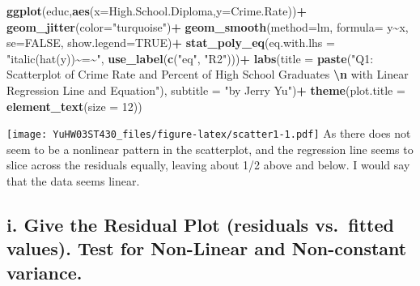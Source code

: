 \documentclass[
]{article}
\newenvironment{Shaded}{\begin{snugshade}}{\end{snugshade}}
\newcommand{\AttributeTok}[1]{\textcolor[rgb]{0.13,0.29,0.53}{#1}}
\newcommand{\ConstantTok}[1]{\textcolor[rgb]{0.56,0.35,0.01}{#1}}
\newcommand{\DecValTok}[1]{\textcolor[rgb]{0.00,0.00,0.81}{#1}}
\newcommand{\FunctionTok}[1]{\textcolor[rgb]{0.13,0.29,0.53}{\textbf{#1}}}
\newcommand{\NormalTok}[1]{#1}
\newcommand{\SpecialCharTok}[1]{\textcolor[rgb]{0.81,0.36,0.00}{\textbf{#1}}}
\newcommand{\StringTok}[1]{\textcolor[rgb]{0.31,0.60,0.02}{#1}}
\begin{document}
\begin{Shaded}
\begin{Highlighting}[]
\FunctionTok{ggplot}\NormalTok{(educ,}\FunctionTok{aes}\NormalTok{(}\AttributeTok{x=}\NormalTok{High.School.Diploma,}\AttributeTok{y=}\NormalTok{Crime.Rate))}\SpecialCharTok{+}
  \FunctionTok{geom\_jitter}\NormalTok{(}\AttributeTok{color=}\StringTok{"turquoise"}\NormalTok{)}\SpecialCharTok{+}
  \FunctionTok{geom\_smooth}\NormalTok{(}\AttributeTok{method=}\StringTok{\textquotesingle{}lm\textquotesingle{}}\NormalTok{, }\AttributeTok{formula=}\NormalTok{ y}\SpecialCharTok{\textasciitilde{}}\NormalTok{x, }
              \AttributeTok{se=}\ConstantTok{FALSE}\NormalTok{,}
              \AttributeTok{show.legend=}\ConstantTok{TRUE}\NormalTok{)}\SpecialCharTok{+}
    \FunctionTok{stat\_poly\_eq}\NormalTok{(}\AttributeTok{eq.with.lhs =} \StringTok{"italic(hat(y))\textasciitilde{}\textasciigrave{}=\textasciigrave{}\textasciitilde{}"}\NormalTok{,}
               \FunctionTok{use\_label}\NormalTok{(}\FunctionTok{c}\NormalTok{(}\StringTok{"eq"}\NormalTok{, }\StringTok{"R2"}\NormalTok{)))}\SpecialCharTok{+}
  \FunctionTok{labs}\NormalTok{(}\AttributeTok{title =} \FunctionTok{paste}\NormalTok{(}\StringTok{"Q1: Scatterplot of Crime Rate and Percent of High School Graduates }\SpecialCharTok{\textbackslash{}n}\StringTok{ with Linear Regression Line and Equation"}\NormalTok{),}
         \AttributeTok{subtitle =} \StringTok{"by Jerry Yu"}\NormalTok{)}\SpecialCharTok{+} 
  \FunctionTok{theme}\NormalTok{(}\AttributeTok{plot.title =} \FunctionTok{element\_text}\NormalTok{(}\AttributeTok{size =} \DecValTok{12}\NormalTok{))}
\end{Highlighting}
\end{Shaded}

\texttt{[image: YuHW03ST430\_files/figure-latex/scatter1-1.pdf]} As there
does not seem to be a nonlinear pattern in the scatterplot, and the
regression line seems to slice across the residuals equally, leaving
about 1/2 above and below. I would say that the data seems linear.

\hypertarget{i.-give-the-residual-plot-residuals-vs.-fitted-values.-test-for-non-linear-and-non-constant-variance.}{%
\subsection{i. Give the Residual Plot (residuals vs.~fitted values).
Test for Non-Linear and Non-constant
variance.}\label{i.-give-the-residual-plot-residuals-vs.-fitted-values.-test-for-non-linear-and-non-constant-variance.}}
\end{document}
